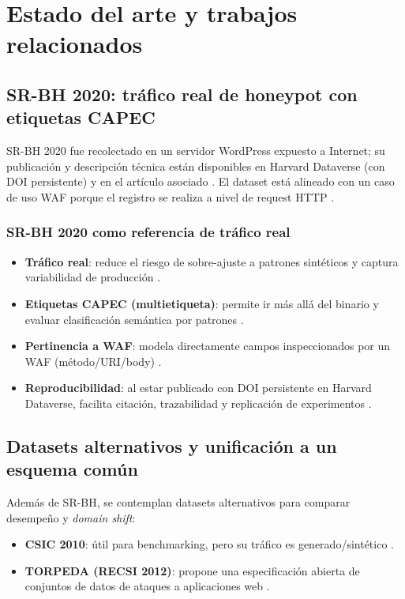 \documentclass[12pt,oneside]{report}
\begin{document}

\chapter{Estado del arte y trabajos relacionados}

\section{SR-BH 2020: tráfico real de honeypot con etiquetas CAPEC}
SR-BH 2020 fue recolectado en un servidor WordPress expuesto a Internet; su publicación y descripción técnica están disponibles
en Harvard Dataverse (con DOI persistente) y en el artículo asociado \cite{srbh_dataverse,srbh_paper}. El dataset está alineado con un caso de uso WAF
porque el registro se realiza a nivel de request HTTP \cite{owasp_waf,modsecurity_site}.

\subsection{SR-BH 2020 como referencia de tráfico real}
\begin{itemize}[leftmargin=*]
  \item \textbf{Tráfico real}: reduce el riesgo de sobre-ajuste a patrones sintéticos y captura variabilidad de producción \cite{srbh_paper}.
  \item \textbf{Etiquetas CAPEC (multietiqueta)}: permite ir más allá del binario y evaluar clasificación semántica por patrones \cite{srbh_paper,capec_about}.
  \item \textbf{Pertinencia a WAF}: modela directamente campos inspeccionados por un WAF (método/URI/body) \cite{owasp_waf,modsecurity_site}.
  \item \textbf{Reproducibilidad}: al estar publicado con DOI persistente en Harvard Dataverse, facilita citación, trazabilidad y replicación de experimentos \cite{srbh_dataverse}.
\end{itemize}

\section{Datasets alternativos y unificación a un esquema común}
Además de SR-BH, se contemplan datasets alternativos para comparar desempeño y \textit{domain shift}:
\begin{itemize}[leftmargin=*]
  \item \textbf{CSIC 2010}: útil para benchmarking, pero su tráfico es generado/sintético \cite{csic2010_impact}.
  \item \textbf{TORPEDA (RECSI 2012)}: propone una especificación abierta de conjuntos de datos de ataques a aplicaciones web \cite{torpeda_2012}.
\end{itemize}
\end{document}

